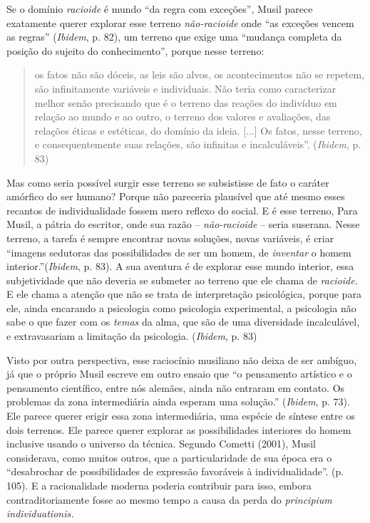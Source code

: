 Se o domínio \emph{racioide} é mundo ``da regra com exceções'', Musil
parece exatamente querer explorar esse terreno \emph{não-racioide} onde
``as exceções vencem as regras'' (\emph{Ibidem}, p. 82), um terreno que
exige uma ``mudança completa da posição do sujeito do conhecimento'',
porque nesse terreno:

\begin{quote}
os fatos não são dóceis, as leis são alvos, os acontecimentos não se
repetem, são infinitamente variáveis e individuais. Não teria como
caracterizar melhor senão precisando que é o terreno das reações do
indivíduo em relação ao mundo e ao outro, o terreno dos valores e
avaliações, das relações éticas e estéticas, do domínio da ideia.
{[}...{]} Os fatos, nesse terreno, e consequentemente suas relações, são
infinitas e incalculáveis''. (\emph{Ibidem}, p. 83)
\end{quote}

Mas como seria possível surgir esse terreno se subsistisse de fato o
caráter amórfico do ser humano? Porque não pareceria plausível que até
mesmo esses recantos de individualidade fossem mero reflexo do social. E
é esse terreno, Para Musil, a pátria do escritor, onde sua razão --
\emph{não-racioide} -- seria suserana. Nesse terreno, a tarefa é sempre
encontrar novas soluções, novas variáveis, é criar ``imagens sedutoras
das possibilidades de ser um homem, de \emph{inventar} o homem
interior.''(\emph{Ibidem}, p. 83). A sua aventura é de explorar esse
mundo interior, essa subjetividade que não deveria se submeter ao
terreno que ele chama de \emph{racioide.} E ele chama a atenção que não
se trata de interpretação psicológica, porque para ele, ainda encarando
a psicologia como psicologia experimental, a psicologia não sabe o que
fazer com os \emph{temas} da alma, que são de uma diversidade
incalculável, e extravasariam a limitação da psicologia. (\emph{Ibidem},
p. 83)

Visto por outra perspectiva, esse raciocínio musiliano não deixa de ser
ambíguo, já que o próprio Musil escreve em outro ensaio que ``o
pensamento artístico e o pensamento científico, entre nós alemães, ainda
não entraram em contato. Os problemas da zona intermediária ainda
esperam uma solução.'' (\emph{Ibidem}, p. 73). Ele parece querer erigir
essa zona intermediária, uma espécie de síntese entre os dois terrenos.
Ele parece querer explorar as possibilidades interiores do homem
inclusive usando o universo da técnica. Segundo Cometti (2001), Musil
considerava, como muitos outros, que a particularidade de sua época era
o ``desabrochar de possibilidades de expressão favoráveis à
individualidade''. (p. 105). E a racionalidade moderna poderia
contribuir para isso, embora contraditoriamente fosse ao mesmo tempo a
causa da perda do \emph{principium} \emph{individuationis.}

